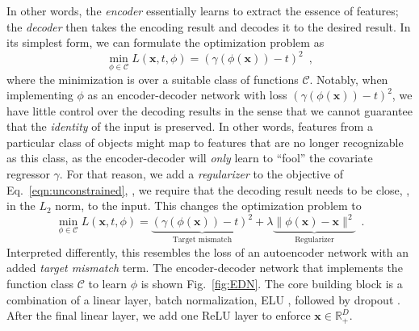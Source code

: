 \documentclass[10pt,twocolumn,letterpaper]{article}
\begin{document}
In other words, the \emph{encoder} essentially learns to extract
the essence of features; the \emph{decoder}
then takes the encoding result and decodes it to the desired result. In
its simplest form, we can formulate the optimization problem as
\begin{equation}
\min_{\phi \in \mathcal{C}} L(\mathbf{x},t,\phi) = (\gamma(\phi(\mathbf{x}))-t)^2\enspace,
\label{eqn:unconstrained}
\end{equation}
where the minimization is 
over a suitable class of functions $\mathcal{C}$. Notably, when implementing 
$\phi$ as an encoder-decoder network with loss 
$(\gamma(\phi(\mathbf{x}))-t)^2$, we have little control over the decoding 
results in the sense that we cannot guarantee that the \emph{identity}
of the input is preserved. In other words, features from a particular class
of objects might map to features that are no longer recognizable as
this class, as the encoder-decoder will \emph{only} learn to ``fool'' the 
covariate regressor $\gamma$.
For that reason, we add a \emph{regularizer} to the objective
of Eq.~\eqref{eqn:unconstrained}, \ie, we require that the 
decoding result needs to be close, \eg, in the $L_2$ norm, to the
input. This changes the optimization problem to
\begin{equation}
\min_{\phi \in \mathcal{C}} L(\mathbf{x},t,\phi) = \underbrace{(\gamma(\phi(\mathbf{x}))-t)^2}_\text{Target mismatch} + 
\lambda \underbrace{\| \phi(\mathbf{x}) - \mathbf{x} \|^2}_{\text{Regularizer}}
\enspace.
\label{eqn:constrained}
\end{equation}
Interpreted differently, this resembles the loss of an autoencoder network with an added \emph{target mismatch} term. The encoder-decoder network that implements the function class $\mathcal{C}$ 
to learn $\phi$ is shown Fig.~\ref{fig:EDN}. 
The core building block is a combination of a linear layer, 
batch normalization, ELU \cite{Clevert16a}, followed by dropout 
\cite{Srivastava14a}. After the final linear
layer, we add one ReLU layer to enforce $\mathbf{x} \in \mathbb{R}^D_+$.
\end{document}
